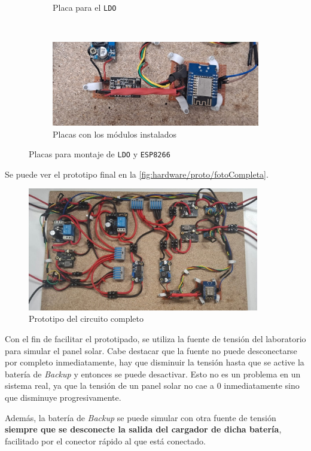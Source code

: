 \begin{figure}[H]
\begin{subfigure}[b]{0.35\textwidth}
        \caption{Placa para el \texttt{LDO}}
    \end{subfigure}
    \\[0.5cm]
    \begin{subfigure}[b]{0.8\textwidth}
        \includegraphics[width=\textwidth]{images/2-hardware/baquelitasConectadas.png}
        \caption{Placas con los módulos instalados}
    \end{subfigure}

    \caption{Placas para montaje de \texttt{LDO} y \texttt{ESP8266}}
\end{figure}

Se puede ver el prototipo final en la \autoref{fig:hardware/proto/fotoCompleta}.

\begin{figure}[H]
    \centering
    \includegraphics[width=0.9\textwidth]{images/2-hardware/circuitoFoto.png}
    \caption{Prototipo del circuito completo}
    \label{fig:hardware/proto/fotoCompleta}
\end{figure}

Con el fin de facilitar el prototipado, se utiliza la fuente de tensión del laboratorio para simular el panel solar. Cabe destacar que la fuente no puede desconectarse por completo inmediatamente, hay que disminuir la tensión hasta que se active la batería de \textit{Backup} y entonces se puede desactivar. Esto no es un problema en un sistema real, ya que la tensión de un panel solar no cae a $0$ inmediatamente sino que disminuye progresivamente.

Además, la batería de \textit{Backup} se puede simular con otra fuente de tensión \textbf{siempre que se desconecte la salida del cargador de dicha batería}, facilitado por el conector rápido al que está conectado.
